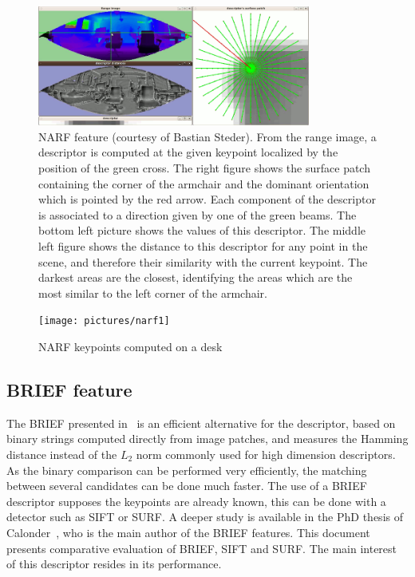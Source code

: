 \begin{figure}[H]
\centering
\includegraphics[width=0.8\textwidth]{figures/narf_descriptor_visualization}
\caption{NARF feature (courtesy of Bastian Steder). From the range image, a descriptor is computed at the given keypoint localized by the position of the green cross. The right figure shows the surface patch containing the corner of the armchair and the dominant orientation which is pointed by the red arrow. Each component of the descriptor is associated to a direction given by one of the green beams. The bottom left picture shows the values of this descriptor. The middle left figure shows the distance to this descriptor for any point in the scene, and therefore their similarity with the current keypoint. The darkest areas are the closest, identifying the areas which are the most similar to the left corner of the armchair.}
\end{figure}

\begin{figure}[H]
\centering
\texttt{[image: pictures/narf1]}
\caption{NARF keypoints computed on a desk}
\end{figure}

\subsection{BRIEF feature}

The \gls{BRIEF} presented in~\cite{Calonder10-brief} is an efficient alternative for the descriptor, based on binary strings computed directly from image patches, and measures the Hamming distance instead of the $L_2$ norm commonly used for high dimension descriptors. As the binary comparison can be performed very efficiently, the matching between several candidates can be done much faster. The use of a \gls{BRIEF} descriptor supposes the keypoints are already known, this can be done with a detector such as \gls{SIFT} or \gls{SURF}. A deeper study is available in the PhD thesis of Calonder~\cite{Calonder10_PhD}, who is the main author of the \gls{BRIEF} features. This document presents comparative evaluation of \gls{BRIEF}, \gls{SIFT} and \gls{SURF}. The main interest of this descriptor resides in its performance.

